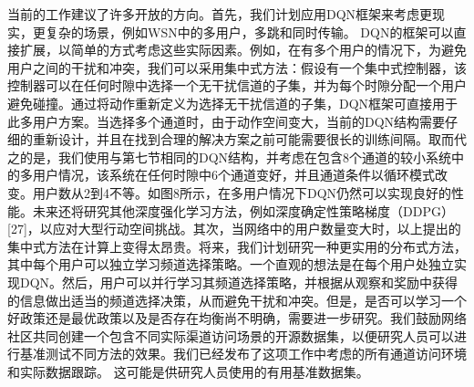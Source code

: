 当前的工作建议了许多开放的方向。首先，我们计划应用DQN框架来考虑更现实，更复杂的场景，例如WSN中的多用户，多跳和同时传输。 DQN的框架可以直接扩展，以简单的方式考虑这些实际因素。例如，在有多个用户的情况下，为避免用户之间的干扰和冲突，我们可以采用集中式方法：假设有一个集中式控制器，该控制器可以在任何时隙中选择一个无干扰信道的子集，并为每个时隙分配一个用户避免碰撞。通过将动作重新定义为选择无干扰信道的子集，DQN框架可直接用于此多用户方案。当选择多个通道时，由于动作空间变大，当前的DQN结构需要仔细的重新设计，并且在找到合理的解决方案之前可能需要很长的训练间隔。取而代之的是，我们使用与第七节相同的DQN结构，并考虑在包含8个通道的较小系统中的多用户情况，该系统在任何时隙中6个通道变好，并且通道条件以循环模式改变。用户数从2到4不等。如图8所示，在多用户情况下DQN仍然可以实现良好的性能。未来还将研究其他深度强化学习方法，例如深度确定性策略梯度（DDPG）[27]，以应对大型行动空间挑战。其次，当网络中的用户数量变大时，以上提出的集中式方法在计算上变得太昂贵。将来，我们计划研究一种更实用的分布式方法，其中每个用户可以独立学习频道选择策略。一个直观的想法是在每个用户处独立实现DQN。然后，用户可以并行学习其频道选择策略，并根据从观察和奖励中获得的信息做出适当的频道选择决策，从而避免干扰和冲突。但是，是否可以学习一个好政策还是最优政策以及是否存在均衡尚不明确，需要进一步研究。我们鼓励网络社区共同创建一个包含不同实际渠道访问场景的开源数据集，以便研究人员可以进行基准测试不同方法的效果。我们已经发布了这项工作中考虑的所有通道访问环境和实际数据跟踪。
这可能是供研究人员使用的有用基准数据集。

